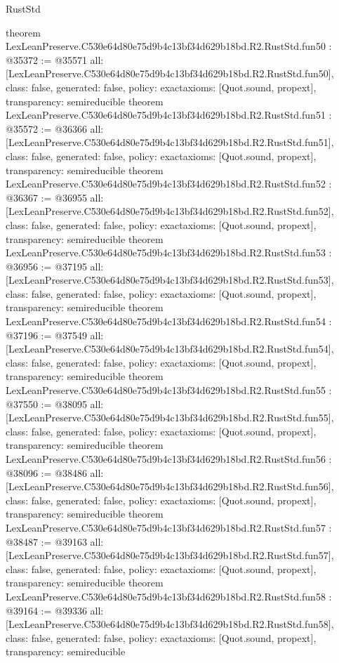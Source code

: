 \begin{lexlean}{RustStd}
\begin{coremodule}
{}
theorem LexLeanPreserve.C530e64d80e75d9b4c13bf34d629b18bd.R2.RustStd.fun50 : @35372 := @35571 {
  all: [LexLeanPreserve.C530e64d80e75d9b4c13bf34d629b18bd.R2.RustStd.fun50],
  class: false,
  generated: false,
  policy: exact{axioms: [Quot.sound, propext]},
  transparency: semireducible
}
theorem LexLeanPreserve.C530e64d80e75d9b4c13bf34d629b18bd.R2.RustStd.fun51 : @35572 := @36366 {
  all: [LexLeanPreserve.C530e64d80e75d9b4c13bf34d629b18bd.R2.RustStd.fun51],
  class: false,
  generated: false,
  policy: exact{axioms: [Quot.sound, propext]},
  transparency: semireducible
}
theorem LexLeanPreserve.C530e64d80e75d9b4c13bf34d629b18bd.R2.RustStd.fun52 : @36367 := @36955 {
  all: [LexLeanPreserve.C530e64d80e75d9b4c13bf34d629b18bd.R2.RustStd.fun52],
  class: false,
  generated: false,
  policy: exact{axioms: [Quot.sound, propext]},
  transparency: semireducible
}
theorem LexLeanPreserve.C530e64d80e75d9b4c13bf34d629b18bd.R2.RustStd.fun53 : @36956 := @37195 {
  all: [LexLeanPreserve.C530e64d80e75d9b4c13bf34d629b18bd.R2.RustStd.fun53],
  class: false,
  generated: false,
  policy: exact{axioms: [Quot.sound, propext]},
  transparency: semireducible
}
theorem LexLeanPreserve.C530e64d80e75d9b4c13bf34d629b18bd.R2.RustStd.fun54 : @37196 := @37549 {
  all: [LexLeanPreserve.C530e64d80e75d9b4c13bf34d629b18bd.R2.RustStd.fun54],
  class: false,
  generated: false,
  policy: exact{axioms: [Quot.sound, propext]},
  transparency: semireducible
}
theorem LexLeanPreserve.C530e64d80e75d9b4c13bf34d629b18bd.R2.RustStd.fun55 : @37550 := @38095 {
  all: [LexLeanPreserve.C530e64d80e75d9b4c13bf34d629b18bd.R2.RustStd.fun55],
  class: false,
  generated: false,
  policy: exact{axioms: [Quot.sound, propext]},
  transparency: semireducible
}
theorem LexLeanPreserve.C530e64d80e75d9b4c13bf34d629b18bd.R2.RustStd.fun56 : @38096 := @38486 {
  all: [LexLeanPreserve.C530e64d80e75d9b4c13bf34d629b18bd.R2.RustStd.fun56],
  class: false,
  generated: false,
  policy: exact{axioms: [Quot.sound, propext]},
  transparency: semireducible
}
theorem LexLeanPreserve.C530e64d80e75d9b4c13bf34d629b18bd.R2.RustStd.fun57 : @38487 := @39163 {
  all: [LexLeanPreserve.C530e64d80e75d9b4c13bf34d629b18bd.R2.RustStd.fun57],
  class: false,
  generated: false,
  policy: exact{axioms: [Quot.sound, propext]},
  transparency: semireducible
}
theorem LexLeanPreserve.C530e64d80e75d9b4c13bf34d629b18bd.R2.RustStd.fun58 : @39164 := @39336 {
  all: [LexLeanPreserve.C530e64d80e75d9b4c13bf34d629b18bd.R2.RustStd.fun58],
  class: false,
  generated: false,
  policy: exact{axioms: [Quot.sound, propext]},
  transparency: semireducible
}
\end{coremodule}
\end{lexlean}
